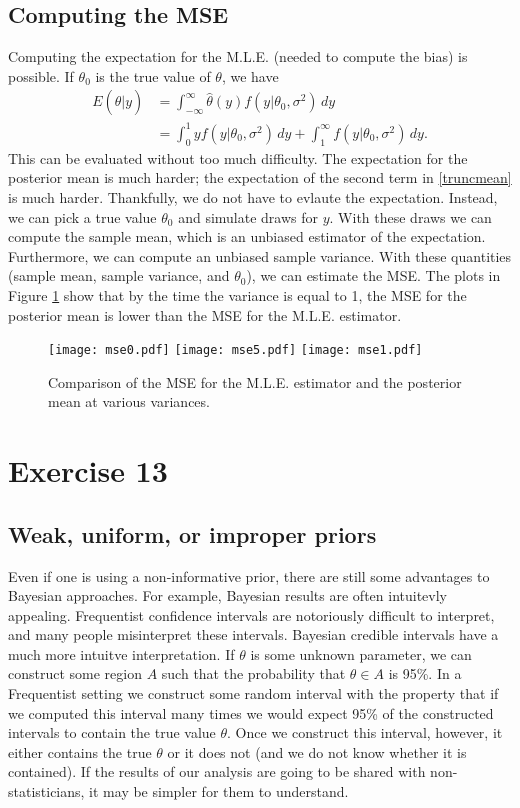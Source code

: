 \documentclass[a4paper,10pt]{article}
\newcommand{\htheta}{\hat{\theta}}
\begin{document}
\subsection{Computing the MSE}
Computing the expectation for the M.L.E. (needed to compute the bias) is possible.  If $\theta_0$ is the true value of $\theta$, we have
\begin{align*}
 E(\htheta|y) &= \int_{-\infty}^\infty \htheta(y)f(y|\theta_0, \sigma^2) \, dy \\
 &= \int_0^1 yf(y|\theta_0, \sigma^2) \, dy + \int_1^\infty f(y|\theta_0, \sigma^2) \, dy.
\end{align*}
This can be evaluated without too much difficulty.  The expectation for the posterior mean is much harder; the expectation of the second term in \ref{truncmean} is much harder.  Thankfully, we do not have to evlaute the expectation.  Instead, we can pick a true value $\theta_0$ and simulate draws for $y$.  With these draws we can compute the sample mean, which is an unbiased estimator of the expectation.  Furthermore, we can compute an unbiased sample variance.  With these quantities (sample mean, sample variance, and $\theta_0$), we can estimate the MSE.   The plots in Figure \ref{mseplots} show that by the time the variance is equal to 1, the MSE for the posterior mean is lower than the MSE for the M.L.E. estimator.  

\begin{figure}
 \centering
 \texttt{[image: mse0.pdf]}
 \texttt{[image: mse5.pdf]}
 \texttt{[image: mse1.pdf]}
 \caption{\label{mseplots} Comparison of the MSE for the M.L.E. estimator and the posterior mean at various variances.}
\end{figure}


\section{Exercise 13}
\subsection{Weak, uniform, or improper priors}
Even if one is using a non-informative prior, there are still some advantages to Bayesian approaches.  For example, Bayesian results are often intuitevly appealing.  Frequentist confidence intervals are notoriously difficult to interpret, and many people misinterpret these intervals.  Bayesian credible intervals have a much more intuitve interpretation.  If $\theta$ is some unknown parameter, we can construct some region $A$ such that the probability that $\theta \in A$ is 95\%.  In a Frequentist setting we construct some random interval with the property that if we computed this interval many times we would expect 95\% of the constructed intervals to contain the true value $\theta$.  Once we construct this interval, however, it either contains the true $\theta$ or it does not (and we do not know whether it is contained).  If the results of our analysis are going to be shared with non-statisticians, it may be simpler for them to understand.
\end{document}
